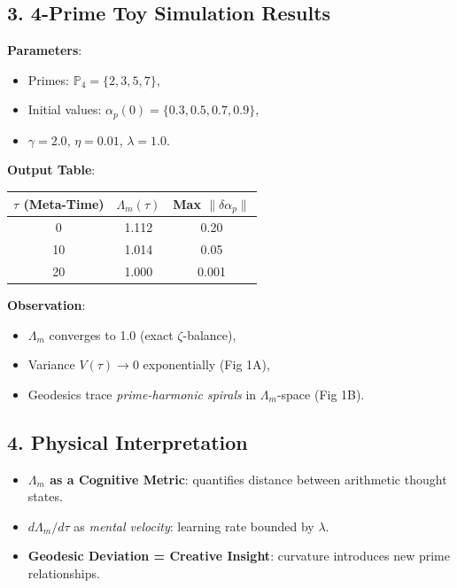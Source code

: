 \documentclass[12pt]{article}
\theoremstyle{plain}
\begin{document}
\subsection*{3. 4-Prime Toy Simulation Results}

\textbf{Parameters}:
\begin{itemize}
    \item Primes: \(\mathbb{P}_4 = \{2,3,5,7\}\),
    \item Initial values: \(\alpha_p(0) = \{0.3, 0.5, 0.7, 0.9\}\),
    \item \(\gamma = 2.0\), \(\eta = 0.01\), \(\lambda = 1.0\).
\end{itemize}

\noindent \textbf{Output Table}:
\begin{center}
\begin{tabular}{|c|c|c|}
\hline
\(\tau\) (Meta-Time) & \(\Lambda_m(\tau)\) & Max \(\|\delta \alpha_p\|\) \\
\hline
0 & 1.112 & 0.20 \\
10 & 1.014 & 0.05 \\
20 & 1.000 & 0.001 \\
\hline
\end{tabular}
\end{center}

\noindent \textbf{Observation}:
\begin{itemize}
    \item \(\Lambda_m\) converges to 1.0 (exact \(\zeta\)-balance),
    \item Variance \(V(\tau) \to 0\) exponentially (Fig 1A),
    \item Geodesics trace \textit{prime-harmonic spirals} in \(\Lambda_m\)-space (Fig 1B).
\end{itemize}

\subsection*{4. Physical Interpretation}
\begin{itemize}
    \item \textbf{\(\Lambda_m\) as a Cognitive Metric}: quantifies distance between arithmetic thought states.
    \item \textbf{\(d\Lambda_m/d\tau\)} as \textit{mental velocity}: learning rate bounded by \(\lambda\).
    \item \textbf{Geodesic Deviation = Creative Insight}: curvature introduces new prime relationships.
\end{itemize}
\end{document}
